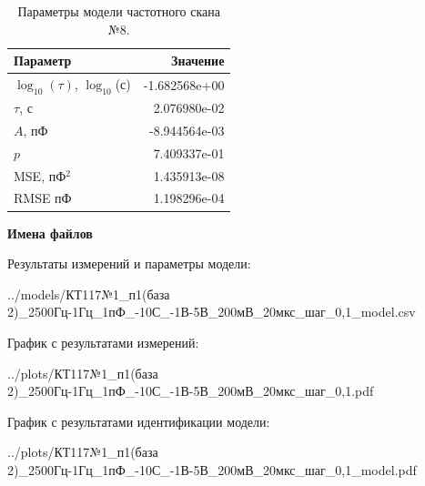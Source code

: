 \begin{table}[!ht]
    \centering
    \caption{Параметры модели частотного скана №8.}
    \begin{tabular}{|l|r|}
        \hline
        Параметр                                       & Значение                  \\ \hline
        $\log_{10}(\tau)$, $\log_{10}$(с)              & -1.682568e+00             \\ \hline
        $\tau$, с                                      & 2.076980e-02              \\ \hline
        $A$, пФ                                        & -8.944564e-03             \\ \hline
        $p$                                            & 7.409337e-01              \\ \hline
        MSE, пФ$^2$                                    & 1.435913e-08              \\ \hline
        RMSE пФ                                        & 1.198296e-04              \\ \hline
    \end{tabular}
    \label{table:frequency_scan_model_8}
\end{table}

\textbf{Имена файлов}

Результаты измерений и параметры модели:

\scriptsize../models/КТ117№1\_п1(база 2)\_2500Гц-1Гц\_1пФ\_-10С\_-1В-5В\_200мВ\_20мкс\_шаг\_0,1\_model.csv
\normalsize

График с результатами измерений:

\scriptsize../plots/КТ117№1\_п1(база 2)\_2500Гц-1Гц\_1пФ\_-10С\_-1В-5В\_200мВ\_20мкс\_шаг\_0,1.pdf
\normalsize

График с результатами идентификации модели:

\scriptsize../plots/КТ117№1\_п1(база 2)\_2500Гц-1Гц\_1пФ\_-10С\_-1В-5В\_200мВ\_20мкс\_шаг\_0,1\_model.pdf
\normalsize

